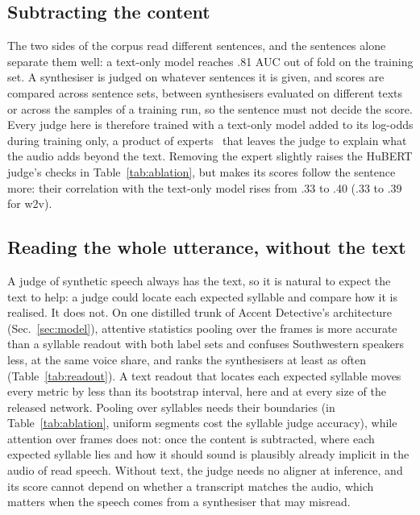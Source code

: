 \documentclass{Interspeech}
\begin{document}
\subsection{Subtracting the content}
\label{sec:content}

The two sides of the corpus read different sentences, and the sentences alone separate them well: a text-only model reaches .81 AUC out of fold on the training set. A synthesiser is judged on whatever sentences it is given, and scores are compared across sentence sets, between synthesisers evaluated on different texts or across the samples of a training run, so the sentence must not decide the score. Every judge here is therefore trained with a text-only model added to its log-odds during training only, a product of experts~\cite{clark2019dont} that leaves the judge to explain what the audio adds beyond the text. Removing the expert slightly raises the HuBERT judge's checks in Table~\ref{tab:ablation}, but makes its scores follow the sentence more: their correlation with the text-only model rises from .33 to .40 (.33 to .39 for w2v).

\subsection{Reading the whole utterance, without the text}
\label{sec:readout}

A judge of synthetic speech always has the text, so it is natural to expect the text to help: a judge could locate each expected syllable and compare how it is realised. It does not. On one distilled trunk of Accent Detective's architecture (Sec.~\ref{sec:model}), attentive statistics pooling over the frames is more accurate than a syllable readout with both label sets and confuses Southwestern speakers less, at the same voice share, and ranks the synthesisers at least as often (Table~\ref{tab:readout}). A text readout that locates each expected syllable moves every metric by less than its bootstrap interval, here and at every size of the released network. Pooling over syllables needs their boundaries (in Table~\ref{tab:ablation}, uniform segments cost the syllable judge accuracy), while attention over frames does not: once the content is subtracted, where each expected syllable lies and how it should sound is plausibly already implicit in the audio of read speech. Without text, the judge needs no aligner at inference, and its score cannot depend on whether a transcript matches the audio, which matters when the speech comes from a synthesiser that may misread.
\end{document}
